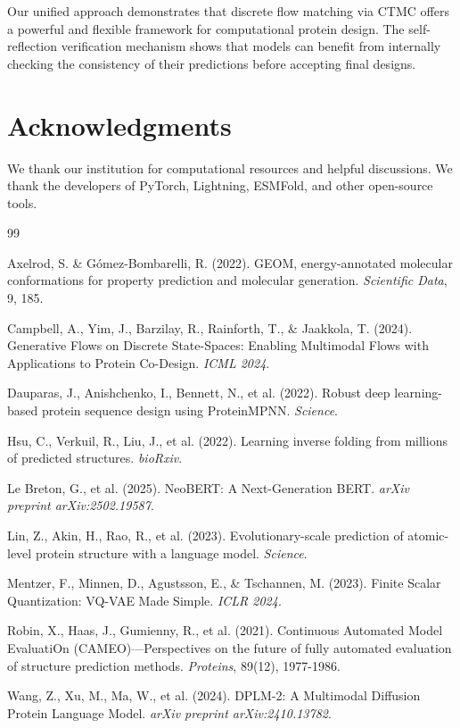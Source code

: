 \documentclass[11pt,a4paper]{article}
\begin{document}
Our unified approach demonstrates that discrete flow matching via CTMC offers a powerful and flexible framework for computational protein design. The self-reflection verification mechanism shows that models can benefit from internally checking the consistency of their predictions before accepting final designs.

\section*{Acknowledgments}

We thank our institution for computational resources and helpful discussions. We thank the developers of PyTorch, Lightning, ESMFold, and other open-source tools.

\begin{thebibliography}{99}

Axelrod, S. \& Gómez-Bombarelli, R. (2022).
GEOM, energy-annotated molecular conformations for property prediction and molecular generation.
\textit{Scientific Data}, 9, 185.

Campbell, A., Yim, J., Barzilay, R., Rainforth, T., \& Jaakkola, T. (2024).
Generative Flows on Discrete State-Spaces: Enabling Multimodal Flows with Applications to Protein Co-Design.
\textit{ICML 2024}.

Dauparas, J., Anishchenko, I., Bennett, N., et al. (2022).
Robust deep learning-based protein sequence design using ProteinMPNN.
\textit{Science}.

Hsu, C., Verkuil, R., Liu, J., et al. (2022).
Learning inverse folding from millions of predicted structures.
\textit{bioRxiv}.

Le Breton, G., et al. (2025).
NeoBERT: A Next-Generation BERT.
\textit{arXiv preprint arXiv:2502.19587}.

Lin, Z., Akin, H., Rao, R., et al. (2023).
Evolutionary-scale prediction of atomic-level protein structure with a language model.
\textit{Science}.

Mentzer, F., Minnen, D., Agustsson, E., \& Tschannen, M. (2023).
Finite Scalar Quantization: VQ-VAE Made Simple.
\textit{ICLR 2024}.

Robin, X., Haas, J., Gumienny, R., et al. (2021).
Continuous Automated Model EvaluatiOn (CAMEO)---Perspectives on the future of fully automated evaluation of structure prediction methods.
\textit{Proteins}, 89(12), 1977-1986.

Wang, Z., Xu, M., Ma, W., et al. (2024).
DPLM-2: A Multimodal Diffusion Protein Language Model.
\textit{arXiv preprint arXiv:2410.13782}.

\end{thebibliography}
\end{document}
